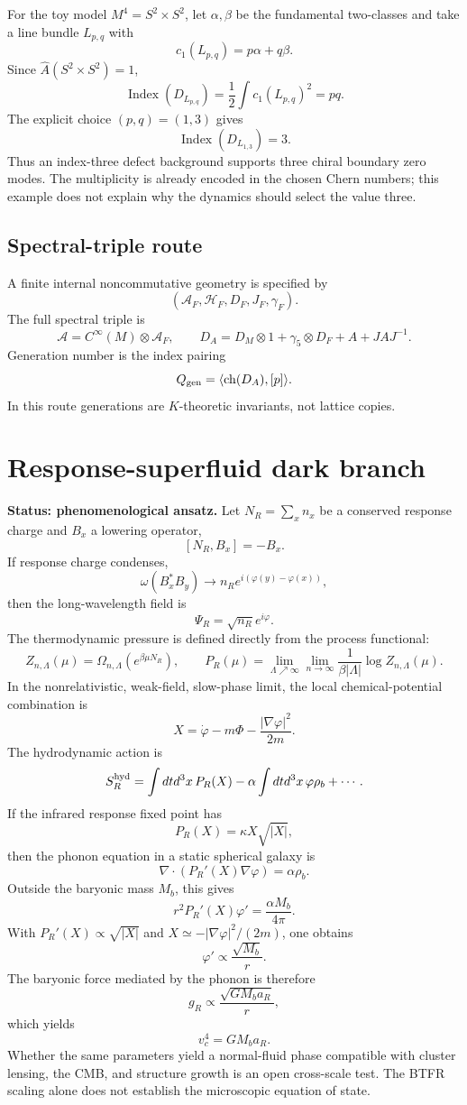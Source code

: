 \documentclass[11pt]{article}
\newcommand{\A}{\mathcal A}
\newcommand{\Hh}{\mathcal H}
\newcommand{\Index}{\operatorname{Index}}
\newcommand{\ch}{\operatorname{ch}}
\begin{document}
For the toy model $M^4=S^2\times S^2$, let $\alpha,\beta$ be the fundamental two-classes and take a line bundle $L_{p,q}$ with
\[
c_1(L_{p,q})=p\alpha+q\beta.
\]
Since $\widehat A(S^2\times S^2)=1$,
\[
\Index(D_{L_{p,q}})=\frac12\int c_1(L_{p,q})^2=pq.
\]
The explicit choice $(p,q)=(1,3)$ gives
\[
\Index(D_{L_{1,3}})=3.
\]
Thus an index-three defect background supports three chiral boundary zero
modes.  The multiplicity is already encoded in the chosen Chern numbers;
this example does not explain why the dynamics should select the value
three.

\subsection*{Spectral-triple route}
A finite internal noncommutative geometry is specified by
\[
(\A_F,\Hh_F,D_F,J_F,\gamma_F).
\]
The full spectral triple is
\[
\A=C^\infty(M)\otimes\A_F,
\qquad
D_A=D_M\otimes1+\gamma_5\otimes D_F+A+JAJ^{-1}.
\]
Generation number is the index pairing
\[
Q_{\rm gen}=\langle\ch(D_A),[p]\rangle.
\]
In this route generations are $K$-theoretic invariants, not lattice copies.

\section{Response-superfluid dark branch}\label{app:superfluid}

\textbf{Status: phenomenological ansatz.}
Let $N_R=\sum_xn_x$ be a conserved response charge and $B_x$ a lowering operator,
\[
[N_R,B_x]=-B_x.
\]
If response charge condenses,
\[
\omega(B_x^*B_y)\to n_Re^{i(\varphi(y)-\varphi(x))},
\]
then the long-wavelength field is
\[
\Psi_R=\sqrt{n_R}e^{i\varphi}.
\]
The thermodynamic pressure is defined directly from the process functional:
\[
Z_{n,\Lambda}(\mu)=\Omega_{n,\Lambda}(e^{\beta\mu N_R}),
\qquad
P_R(\mu)=\lim_{\Lambda\nearrow\infty}\lim_{n\to\infty}\frac{1}{\beta|\Lambda|}\log Z_{n,\Lambda}(\mu).
\]
In the nonrelativistic, weak-field, slow-phase limit, the local chemical-potential combination is
\[
X=\dot\varphi-m\Phi-\frac{|\nabla\varphi|^2}{2m}.
\]
The hydrodynamic action is
\[
S_R^{\rm hyd}=\int dtd^3x\,P_R(X)-\alpha\int dtd^3x\,\varphi\rho_b+\cdots.
\]
If the infrared response fixed point has
\[
P_R(X)=\kappa X\sqrt{|X|},
\]
then the phonon equation in a static spherical galaxy is
\[
\nabla\cdot(P_R'(X)\nabla\varphi)=\alpha\rho_b.
\]
Outside the baryonic mass $M_b$, this gives
\[
r^2P_R'(X)\varphi'=\frac{\alpha M_b}{4\pi}.
\]
With $P_R'(X)\propto\sqrt{|X|}$ and $X\simeq-|\nabla\varphi|^2/(2m)$, one obtains
\[
\varphi'\propto \frac{\sqrt{M_b}}{r}.
\]
The baryonic force mediated by the phonon is therefore
\[
g_R\propto\frac{\sqrt{GM_ba_R}}{r},
\]
which yields
\[
v_c^4=GM_ba_R.
\]
Whether the same parameters yield a normal-fluid phase compatible with
cluster lensing, the CMB, and structure growth is an open cross-scale test.
The BTFR scaling alone does not establish the microscopic equation of state.
\end{document}
